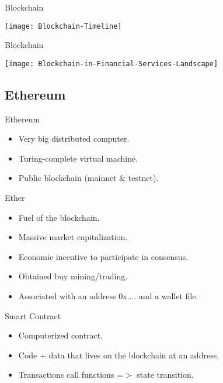 \documentclass{beamer}
\begin{document}
\begin{frame}{Blockchain}
	\begin{center}
		\texttt{[image: Blockchain-Timeline]}
	\end{center}
\end{frame}

\begin{frame}{Blockchain}
	\begin{center}
		\texttt{[image: Blockchain-in-Financial-Services-Landscape]}
	\end{center}
\end{frame}

\subsection{Ethereum}

\begin{frame}{Ethereum}
	\begin{itemize}
		\item {
			Very big distributed computer.
		}
		\item {
			Turing-complete virtual machine.
		}
		\item {
			Public blockchain (mainnet \& testnet).
		}
	\end{itemize}
\end{frame}

\begin{frame}{Ether}
	\begin{itemize}
		\item {
			Fuel of the blockchain.
		}
		\item {
			Massive market capitalization.
		}
		\item {
			Economic incentive to participate in consensus.
		}
		\item {
			Obtained buy mining/trading.
		}
		\item {
			Associated with an address 0x.... and a wallet file.
		}
	\end{itemize}
\end{frame}

\begin{frame}{Smart Contract}
	\begin{itemize}
		\item {
			Computerized contract.
		}
		\item {
			Code + data that lives on the blockchain at an address.
		}
		\item {
			Transactions call functions =$>$ state transition.
		}
	\end{itemize}
\end{frame}
\end{document}
